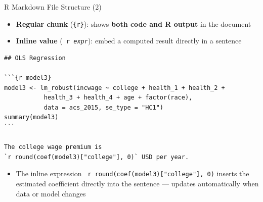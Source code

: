 \documentclass[dvipsnames,hyperref={pdfpagelabels=false}]{beamer}
\begin{document}
\begin{frame}[fragile]{R Markdown File Structure (2)}

	\begin{itemize}
		\item \textbf{Regular chunk} (\texttt{\{r\}}): shows \textbf{both code and R output} in the document
		\vspace{0.2cm}
		\item \textbf{Inline value} (\texttt{{} r \textit{expr}{}}): embed a computed result directly in a sentence
	\end{itemize}

\begin{lstlisting}[language={},basicstyle=\ttfamily\fontsize{7.5}{9}\selectfont,keywordstyle={}]
## OLS Regression

```{r model3}
model3 <- lm_robust(incwage ~ college + health_1 + health_2 +
           health_3 + health_4 + age + factor(race),
           data = acs_2015, se_type = "HC1")
summary(model3)
```

The college wage premium is
`r round(coef(model3)["college"], 0)` USD per year.
\end{lstlisting}

	\begin{itemize}
		\item The inline expression \texttt{{} r round(coef(model3)["college"], 0){}} inserts the estimated coefficient directly into the sentence --- updates automatically when data or model changes
	\end{itemize}

\end{frame}
\end{document}

